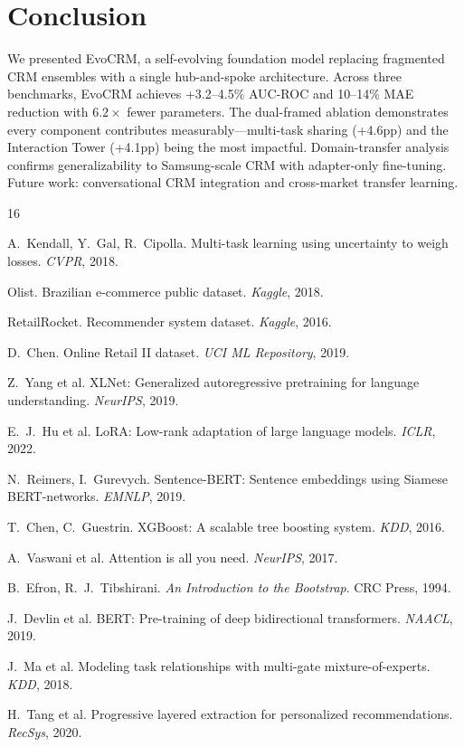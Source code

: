 \documentclass[10pt,twocolumn]{article}
\begin{document}
\section{Conclusion}

We presented EvoCRM, a self-evolving foundation model replacing fragmented CRM ensembles with a single hub-and-spoke architecture. Across three benchmarks, EvoCRM achieves +3.2--4.5\% AUC-ROC and 10--14\% MAE reduction with $6.2\times$ fewer parameters. The dual-framed ablation demonstrates every component contributes measurably---multi-task sharing (+4.6pp) and the Interaction Tower (+4.1pp) being the most impactful. Domain-transfer analysis confirms generalizability to Samsung-scale CRM with adapter-only fine-tuning. Future work: conversational CRM integration and cross-market transfer learning.

{\scriptsize

\begin{thebibliography}{16}

A.~Kendall, Y.~Gal, R.~Cipolla. Multi-task learning using uncertainty to weigh losses. \emph{CVPR}, 2018.

Olist. Brazilian e-commerce public dataset. \emph{Kaggle}, 2018.

RetailRocket. Recommender system dataset. \emph{Kaggle}, 2016.

D.~Chen. Online Retail II dataset. \emph{UCI ML Repository}, 2019.

Z.~Yang et al. XLNet: Generalized autoregressive pretraining for language understanding. \emph{NeurIPS}, 2019.

E.~J.~Hu et al. LoRA: Low-rank adaptation of large language models. \emph{ICLR}, 2022.

N.~Reimers, I.~Gurevych. Sentence-BERT: Sentence embeddings using Siamese BERT-networks. \emph{EMNLP}, 2019.

T.~Chen, C.~Guestrin. XGBoost: A scalable tree boosting system. \emph{KDD}, 2016.

A.~Vaswani et al. Attention is all you need. \emph{NeurIPS}, 2017.

B.~Efron, R.~J.~Tibshirani. \emph{An Introduction to the Bootstrap}. CRC Press, 1994.

J.~Devlin et al. BERT: Pre-training of deep bidirectional transformers. \emph{NAACL}, 2019.

J.~Ma et al. Modeling task relationships with multi-gate mixture-of-experts. \emph{KDD}, 2018.

H.~Tang et al. Progressive layered extraction for personalized recommendations. \emph{RecSys}, 2020.

\end{thebibliography}
}
\end{document}
